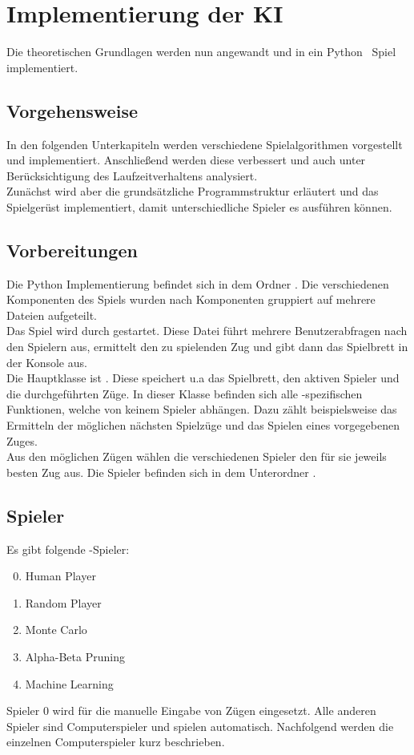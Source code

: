 \chapter{Implementierung der KI}
Die theoretischen Grundlagen werden nun angewandt und in ein Python \ot\ Spiel implementiert. 
\section{Vorgehensweise}
In den folgenden Unterkapiteln  werden verschiedene Spielalgorithmen vorgestellt und implementiert. Anschließend werden diese verbessert und auch unter Berücksichtigung des Laufzeitverhaltens analysiert.
\\Zunächst wird aber die grundsätzliche Programmstruktur erläutert und das Spielgerüst implementiert, damit unterschiedliche Spieler es ausführen können.
\section{Vorbereitungen}
Die Python Implementierung befindet sich in dem Ordner . Die verschiedenen Komponenten des Spiels wurden nach Komponenten gruppiert auf mehrere Dateien aufgeteilt.
\\Das Spiel wird durch  gestartet.
Diese Datei führt mehrere Benutzerabfragen nach den Spielern aus, ermittelt den zu spielenden Zug und gibt dann das Spielbrett in der Konsole aus.
\\Die Hauptklasse ist . Diese speichert u.a das Spielbrett, den aktiven Spieler und die durchgeführten Züge. In dieser Klasse befinden sich alle \ot-spezifischen Funktionen, welche von keinem Spieler abhängen. Dazu zählt beispielsweise das Ermitteln der möglichen nächsten Spielzüge und das Spielen eines vorgegebenen Zuges.
\\Aus den möglichen Zügen wählen die verschiedenen Spieler den für sie jeweils besten Zug aus. Die Spieler befinden sich in dem Unterordner .
\section{Spieler}
Es gibt folgende -Spieler:
\begin{enumerate}
\setcounter{enumi}{-1}
\item Human Player
\item Random Player
\item Monte Carlo
\item Alpha-Beta Pruning
\item Machine Learning
\end{enumerate}
Spieler 0 wird für die manuelle Eingabe von Zügen eingesetzt. Alle anderen Spieler sind Computerspieler und spielen automatisch.
Nachfolgend werden die einzelnen Computerspieler kurz beschrieben.

